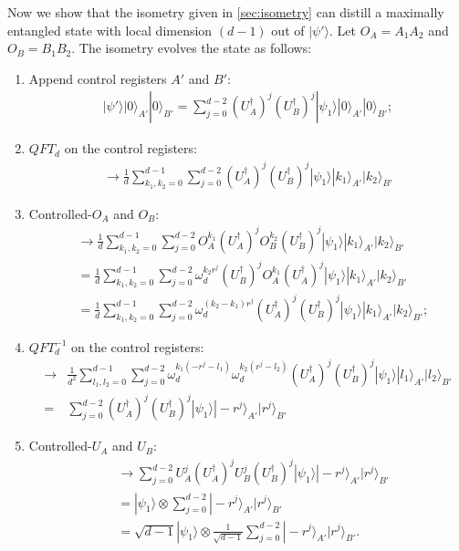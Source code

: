 \documentclass[11pt,letterpaper]{article}
\newcommand{\ket}[1]{|#1\rangle}
\newcommand{\x}{\otimes}
\newcommand{\ct}{^{\dagger}}
\newcommand{\1}{\mathbb{1}}
\theoremstyle{definition}
\begin{document}
Now we show that the isometry given in \cref{sec:isometry} can distill a maximally entangled
state with local dimension $(d-1)$ out of $\ket{\psi'}$.
Let $O_A = A_1A_2$ and $O_B = B_1B_2$.
The isometry evolves the state as follows:
\begin{enumerate}
	\item Append control registers $A'$ and $B'$:
	\begin{align}
		\ket{\psi'} \ket{0}_{A'}\ket{0}_{B'} = 
		\sum_{j=0}^{d-2} (U_A\ct)^j (U_B\ct)^j \ket{\psi_1} \ket{0}_{A'}\ket{0}_{B'};
	\end{align}
	\item $QFT_d$ on the control registers:
	\begin{align}
		\to \frac{1}{d}\sum_{k_1,k_2 = 0}^{d-1} \sum_{j=0}^{d-2} (U_A\ct)^j (U_B\ct)^j \ket{\psi_1} \ket{k_1}_{A'}\ket{k_2}_{B'}
	\end{align}
	\item Controlled-$O_A$ and $O_B$:
	\begin{align}
		&\to \frac{1}{d}\sum_{k_1,k_2 = 0}^{d-1} \sum_{j=0}^{d-2} O_A^{k_1}(U_A\ct)^j O_B^{k_2}(U_B\ct)^j
		 \ket{\psi_1} \ket{k_1}_{A'}\ket{k_2}_{B'}\\
		 &= \frac{1}{d} \sum_{k_1,k_2 = 0}^{d-1} \sum_{j=0}^{d-2} \omega_d^{k_2r^j} (U_B\ct)^j O_A^{k_1}(U_A\ct)^j 
		  \ket{\psi_1} \ket{k_1}_{A'}\ket{k_2}_{B'}\\
		&=\frac{1}{d} \sum_{k_1,k_2 = 0}^{d-1} \sum_{j=0}^{d-2} \omega_d^{(k_2-k_1)r^j}
		(U_A\ct)^j(U_B\ct)^j  \ket{\psi_1} \ket{k_1}_{A'}\ket{k_2}_{B'};
	\end{align}
	\item $QFT_d^{-1}$ on the control registers:
	\begin{align}
		\to &\frac{1}{d^2}\sum_{l_1,l_2 = 0}^{d-1}\sum_{j=0}^{d-2} \omega_d^{k_1(-r^j-l_1)}\omega_d^{k_2(r^j-l_2)}
		 (U_A\ct)^j(U_B\ct)^j \ket{\psi_1} \ket{l_1}_{A'}\ket{l_2}_{B'}\\
		= &\sum_{j=0}^{d-2}(U_A\ct)^j(U_B\ct)^j  \ket{\psi_1} \ket{-r^j}_{A'}\ket{r^j}_{B'}
	\end{align}
	\item Controlled-$U_A$ and $U_B$:
	\begin{align}
		&\to \sum_{j=0}^{d-2} U_A^j (U_A\ct)^j U_B^j (U_B\ct)^j  \ket{\psi_1} \ket{-r^j}_{A'}\ket{r^j}_{B'}\\
		&=  \ket{\psi_1} \x \sum_{j=0}^{d-2} \ket{-r^j}_{A'}\ket{r^j}_{B'}\\
		&= \sqrt{d-1} \ket{\psi_1} \x \frac{1}{\sqrt{d-1}} \sum_{j=0}^{d-2} \ket{-r^j}_{A'}\ket{r^j}_{B'}.
	\end{align}
\end{enumerate}
\end{document}
